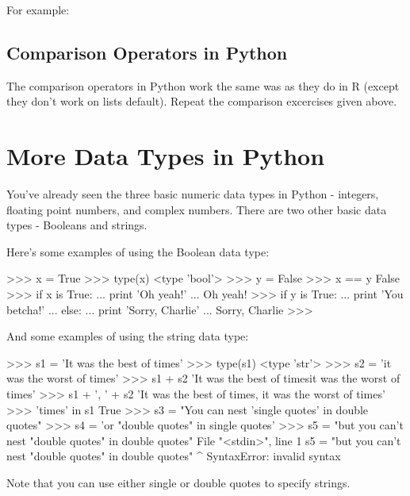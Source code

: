 For example:
%

\subsection{Comparison Operators in Python}

The comparison operators in Python work the same was as they do in R
(except they don't work on lists default). Repeat the comparison
excercises given above.

\section{More Data Types in Python}

You've already seen the three basic numeric data types in Python -
integers, floating point numbers, and complex numbers. There are two
other basic data types - Booleans and strings.

Here's some examples of using the Boolean data type:

\begin{python}
>>> x = True
>>> type(x)
<type 'bool'>
>>> y = False
>>> x == y
False
>>> if x is True:
...     print 'Oh yeah!'
... 
Oh yeah!
>>> if y is True:
...     print 'You betcha!'
... else:
...     print 'Sorry, Charlie'
... 
Sorry, Charlie
>>>
\end{python}
%
And some examples of using the string data type:
%
\begin{python}
>>> s1 = 'It was the best of times'
>>> type(s1)
<type 'str'>
>>> s2 = 'it was the worst of times'
>>> s1 + s2
'It was the best of timesit was the worst of times'
>>> s1 + ', ' + s2
'It was the best of times, it was the worst of times'
>>> 'times' in s1
True
>>> s3 = "You can nest 'single quotes' in double quotes"
>>> s4 = 'or "double quotes" in single quotes'
>>> s5 = "but you can't nest "double quotes" in double quotes"
  File "<stdin>", line 1
    s5 = "but you can't nest "double quotes" in double quotes"
                                   ^
SyntaxError: invalid syntax
\end{python}
%
Note that you can use either single or double quotes to specify strings.


